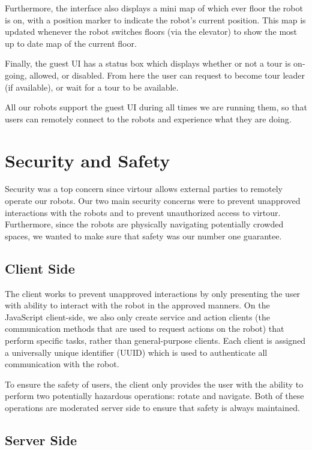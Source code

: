 \documentclass[
  oneside,
  11pt, a4paper,
  footinclude=true,
  headinclude=true,
  cleardoublepage=empty
]{article}
\begin{document}
Furthermore, the interface also displays a mini map of which ever floor the
robot is on, with a position marker to indicate the robot's current position.
This map is updated whenever the robot switches floors (via the elevator) to
show the most up to date map of the current floor.

Finally, the guest UI has a status box which displays whether or not a tour is
on-going, allowed, or disabled. From here the user can request to become tour
leader (if available), or wait for a tour to be available.

All our robots support the guest UI during all times we are running them, so
that users can remotely connect to the robots and experience what they are
doing.

\section{Security and Safety}

Security was a top concern since virtour allows external parties to remotely
operate our robots. Our two main security concerns were to prevent unapproved
interactions with the robots and to prevent unauthorized access to virtour.
Furthermore, since the robots are physically navigating potentially crowded
spaces, we wanted to make sure that safety was our number one guarantee.

\subsection{Client Side}

The client works to prevent unapproved interactions by only presenting the user
with ability to interact with the robot in the approved manners. On the
JavaScript client-side, we also only create service and action clients (the
communication methods that are used to request actions on the robot) that
perform specific tasks, rather than general-purpose clients. Each client is
assigned a universally unique identifier (UUID) which is used to authenticate
all communication with the robot.

To ensure the safety of users, the client only provides the user with the
ability to perform two potentially hazardous operations: rotate and navigate.
Both of these operations are moderated server side to ensure that safety is
always maintained.

\subsection{Server Side}
\end{document}
